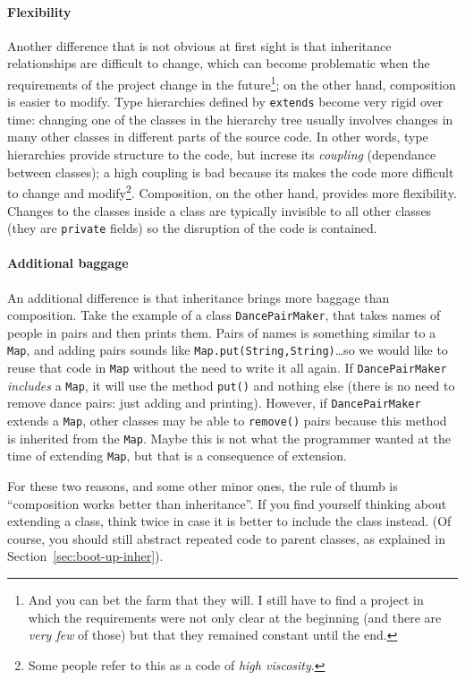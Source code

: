 \paragraph{Flexibility }
\label{sec:flexibility-}

Another difference that is not obvious at first sight is that 
inheritance relationships are difficult to change, which can 
become problematic when the requirements
of the project change in the future\footnote{And you can bet the farm
  that they will. I still have to find a project in which the
  requirements were not only clear at the beginning (and there are
  \emph{very few} of those) but that they remained constant until the end.}; 
on the other hand, composition is
easier to modify. Type hierarchies defined by \verb+extends+ become
very rigid over time: changing one of the classes in the hierarchy
tree usually involves changes in many other classes in different parts
of the source code. In other words, type hierarchies provide structure
to the code, but increse its \emph{coupling} (dependance between
classes); a high coupling is bad because its makes the code more
difficult to change and modify\footnote{Some people refer to this as a
code of \emph{high viscosity}. }. 
Composition, on
the other hand, provides more flexibility. Changes to the classes
inside a class are typically invisible to all other classes (they are
\verb+private+ fields) so the disruption of the code is contained. 

\paragraph{Additional baggage}
\label{sec:additional-baggage}

An additional difference is that inheritance brings more baggage than
composition. Take the example of a class \verb+DancePairMaker+, that
takes names of people in pairs and then prints them. Pairs of names
is something similar to a \verb+Map+, and adding pairs sounds like
\verb+Map.put(String,String)+\ldots so we would like to reuse that
code in \verb+Map+ without the need to write it all again. 
If \verb+DancePairMaker+ \emph{includes} a
\verb+Map+, it will use the method \verb+put()+ and nothing
else (there is no need to remove dance pairs: just adding and
printing). 
However, if \verb+DancePairMaker+ extends a \verb+Map+, other
classes may be able to \verb+remove()+ pairs because this method is
inherited from the \verb+Map+. 
Maybe this is not what the programmer wanted at the time of extending
\verb+Map+, but that is a consequence of extension. 

For these two reasons, and some other minor ones, the rule of thumb is
``composition works better than inheritance''. If you find yourself
thinking about extending a class, think twice in case it is better to
include the class instead. (Of course,
you should still abstract repeated code to parent classes, as
explained in Section~\ref{sec:boot-up-inher}).





